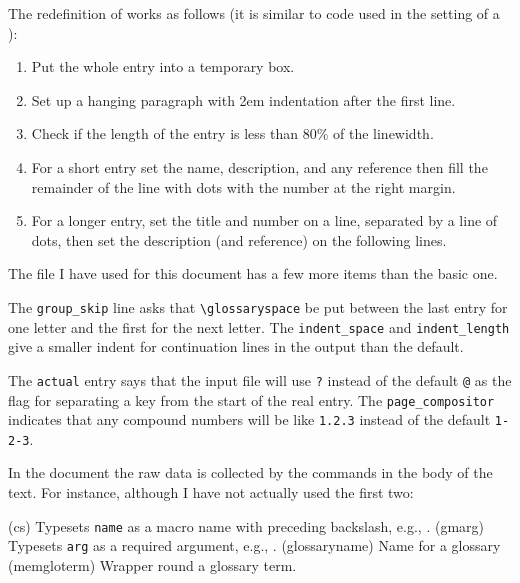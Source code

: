     The redefinition of \cmd{\glossitem} works as follows (it is similar
to code used in the setting of a \cmd{\caption}):
\begin{enumerate}
\item Put the whole entry into a temporary box.
\item Set up a hanging paragraph with 2em indentation after the first line.
\item Check if the length of the entry is less than 80\% of the linewidth.
\item For a short entry set the name, description, and any reference then
      fill the remainder of the line with dots with the number at the right
      margin.
\item For a longer entry, set the title and number on a line, separated
      by a line of dots, then set the description (and reference) on
      the following lines.
\end{enumerate}

    The  file I have used for this document has a few more items
than the basic one.
\begin{lcode}
preamble "\\begin{theglossary}"
postamble "\n\\end{theglossary}\n"
group_skip "\n\\glossaryspace\n"
item_0    "\n\\glossitem"
delim_0   "{\\memglonum{"
encap_suffix "}}}"
indent_space "\t"
indent_length 2
keyword "\\glossaryentry"
actual '?'
page_compositor "."
\end{lcode}

The \verb?group_skip? line asks that \verb?\glossaryspace? be put between the 
last entry for one letter and the first for the next letter. 
The \verb?indent_space? and \verb?indent_length? give a smaller indent for
continuation lines in the output than the default.

    The \verb?actual? entry says that the input file will use \verb+?+ instead
of the default \verb+@+ as the flag for separating a key from the start of 
the real entry. The \verb?page_compositor? indicates that any compound numbers
will be like \verb?1.2.3? instead of the default \verb?1-2-3?.

In the document the raw data is collected by the \cmd{\glossary} commands 
in the body of the text. For instance, although I have not actually used
the first two:
\begin{lcode}
\glossary(cs)%
  {}%
  {Typesets \texttt{name} as a macro name with preceding backslash,
   e.g., .}%
\glossary(gmarg)%
  {}%
  {Typesets \texttt{arg} as a required argument, e.g., .}
\glossary(glossaryname)%
  {}%
  {Name for a glossary}%
\glossary(memgloterm)%
  {}%
  {Wrapper round a glossary term.}%
\end{lcode}

